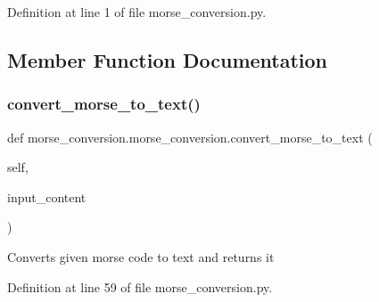 Definition at line 1 of file morse\+\_\+conversion.\+py.



\subsection{Member Function Documentation}
\mbox{\label{classmorse__conversion_1_1morse__conversion_a541fbc681012d7974aba16a1a1460bc2}} 
\subsubsection{\texorpdfstring{convert\+\_\+morse\+\_\+to\+\_\+text()}{convert\_morse\_to\_text()}}
{\footnotesize\ttfamily def morse\+\_\+conversion.\+morse\+\_\+conversion.\+convert\+\_\+morse\+\_\+to\+\_\+text (\begin{DoxyParamCaption}\item[{}]{self,  }\item[{}]{input\+\_\+content }\end{DoxyParamCaption})}

\begin{DoxyVerb}Converts given morse code to text and returns it\end{DoxyVerb}
 

Definition at line 59 of file morse\+\_\+conversion.\+py.


